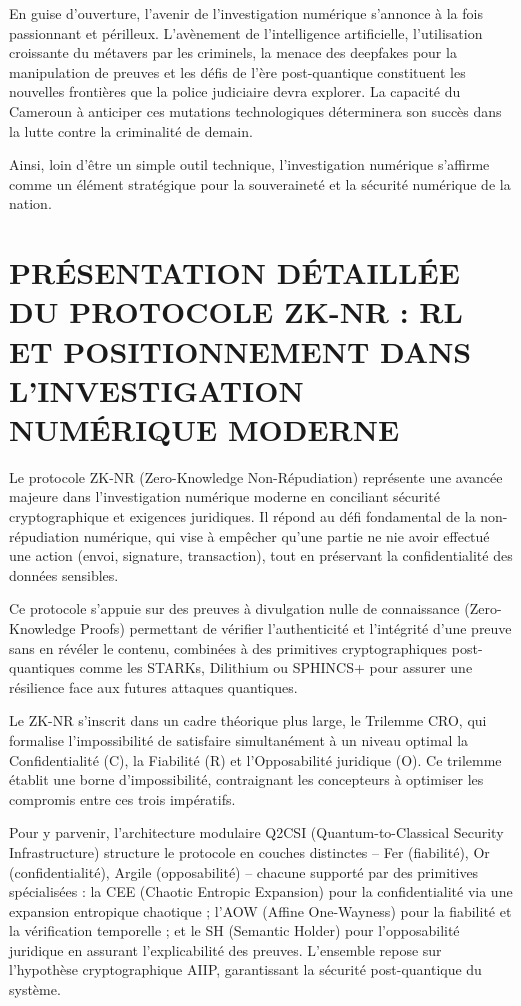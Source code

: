 \documentclass[12pt,a4paper]{article}
\begin{document}
En guise d'ouverture, l'avenir de l'investigation numérique s'annonce à la fois passionnant et périlleux. L'avènement de l'intelligence artificielle, l'utilisation croissante du métavers par les criminels, la menace des deepfakes pour la manipulation de preuves et les défis de l'ère post-quantique constituent les nouvelles frontières que la police judiciaire devra explorer. La capacité du Cameroun à anticiper ces mutations technologiques déterminera son succès dans la lutte contre la criminalité de demain. 

Ainsi, loin d'être un simple outil technique, l'investigation numérique s'affirme comme un élément stratégique pour la souveraineté et la sécurité numérique de la nation.

\section{PRÉSENTATION DÉTAILLÉE DU PROTOCOLE ZK-NR : RL ET POSITIONNEMENT DANS L'INVESTIGATION NUMÉRIQUE MODERNE}

Le protocole ZK-NR (Zero-Knowledge Non-Répudiation) représente une avancée majeure dans l'investigation numérique moderne en conciliant sécurité cryptographique et exigences juridiques. Il répond au défi fondamental de la non-répudiation numérique, qui vise à empêcher qu'une partie ne nie avoir effectué une action (envoi, signature, transaction), tout en préservant la confidentialité des données sensibles. 

Ce protocole s'appuie sur des preuves à divulgation nulle de connaissance (Zero-Knowledge Proofs) permettant de vérifier l'authenticité et l'intégrité d'une preuve sans en révéler le contenu, combinées à des primitives cryptographiques post-quantiques comme les STARKs, Dilithium ou SPHINCS+ pour assurer une résilience face aux futures attaques quantiques. 

Le ZK-NR s'inscrit dans un cadre théorique plus large, le Trilemme CRO, qui formalise l'impossibilité de satisfaire simultanément à un niveau optimal la Confidentialité (C), la Fiabilité (R) et l'Opposabilité juridique (O). Ce trilemme établit une borne d'impossibilité, contraignant les concepteurs à optimiser les compromis entre ces trois impératifs. 

Pour y parvenir, l'architecture modulaire Q2CSI (Quantum-to-Classical Security Infrastructure) structure le protocole en couches distinctes -- Fer (fiabilité), Or (confidentialité), Argile (opposabilité) -- chacune supporté par des primitives spécialisées : la CEE (Chaotic Entropic Expansion) pour la confidentialité via une expansion entropique chaotique ; l'AOW (Affine One-Wayness) pour la fiabilité et la vérification temporelle ; et le SH (Semantic Holder) pour l'opposabilité juridique en assurant l'explicabilité des preuves. L'ensemble repose sur l'hypothèse cryptographique AIIP, garantissant la sécurité post-quantique du système. 
\end{document}
